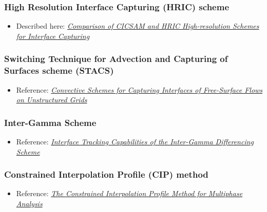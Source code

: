 \documentclass[]{report}
\begin{document}
\subsubsection{High Resolution Interface Capturing (HRIC) scheme}

\begin{itemize}
    \item Described here: \textit{\href{http://warminski.pollub.plwww.ptmts.org.pl/Waclaw-Koron-2-08.pdf}{Comparison of CICSAM and HRIC High-resolution Sche\-mes for Interface Capturing}}
\end{itemize}

\subsubsection{Switching Technique for Advection and Capturing of Surfaces scheme (STACS)}

\begin{itemize}
    \item Reference: \textit{\href{http://webfea-lb.fea.aub.edu.lb/cfd/pdfs/publications2/STACS-Complete.pdf}{Convective Schemes for Capturing Interfaces of Free-Surface Flows on Unstructured Grids}}
\end{itemize}

\subsubsection{Inter-Gamma Scheme}

\begin{itemize}
    \item Reference: \textit{\href{http://powerlab.fsb.hr/ped/kturbo/openfoam/docs/InterTrack.pdf}{Interface Tracking Capabilities of the Inter-Gamma Differencing Scheme}}
\end{itemize}

\subsubsection{Constrained Interpolation Profile (CIP) method}


\begin{itemize}
    \item Reference: \textit{\href{http://www.mech.titech.ac.jp/~ryuutai/paper/JCP2001CIPReviewYabe.pdf}{The Constrained Interpolation Profile Method for Multiphase Analysis}}
\end{itemize}
\end{document}
